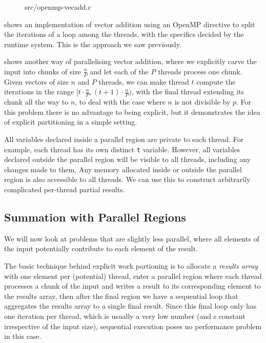 \begin{figure}

{src/openmp-vecadd.c}
\end{figure}


 shows an implementation of vector
addition using an OpenMP directive to split the iterations of a loop
among the threads, with the specifics decided by the runtime system.
This is the approach we saw previously.

 shows another way of parallelising
vector addition, where we explicitly carve the input into chunks of
size $\frac{n}{P}$ and let each of the $P$ threads process one chunk.
Given vectors of size $n$ and $P$ threads, we can make thread $t$
compute the iterations in the range
$[t\cdot \frac{n}{P},(t+1)\cdot \frac{n}{P})$, with the final thread
extending its chunk all the way to $n$, to deal with the case where
$n$ is not divisible by $p$. For this problem there is no advantage to
being explicit, but it demonstrates the idea of explicit partitioning
in a simple setting.

All variables declared inside a parallel region are private to each
thread. For example, each thread has its own distinct \texttt{t}
variable. However, all variables declared outside the parallel region
will be visible to all threads, including any changes made to them.
Any memory allocated inside or outside the parallel region is also
accessible to all threads. We can use this to construct arbitrarily
complicated per-thread partial results.

\subsection{Summation with Parallel Regions}
\label{sec:parallel-summation}

We will now look at problems that are slightly less parallel, where
all elements of the input potentially contribute to each element of
the result.

The basic technique behind explicit work partioning is to allocate a
\emph{results array} with one element per (potential) thread, enter a
parallel region where each thread processes a chunk of the input and
writes a result to its corresponding element to the results array,
then after the final region we have a sequential loop that aggregates
the results array to a single final result. Since this final loop only
has one iteration per thread, which is usually a very low number (and
s constant irrespective of the input size), sequential execution poses
no performance problem in this case.

